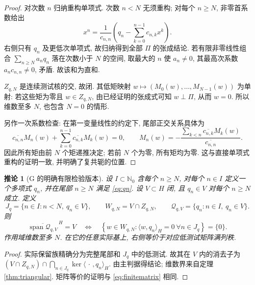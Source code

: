 \documentclass[UTF8,11pt]{ctexart}
\newtheorem{corollary}[theorem]{推论}
\theoremstyle{definition}
\DeclareMathOperator{\Span}{span}
\newcommand{\ip}[2]{\langle #1,#2\rangle_H}
\newcommand{\clspan}[1]{\overline{\Span #1}^{\,H}}
\newcommand{\Q}{\mathcal Q}
\begin{document}
\begin{proof}
对次数 $n$ 归纳重构单项式. 次数 $n<N$ 无须重构;
对每个 $n\geq N$, 非零首系数给出
\begin{equation}\label{eq:qmonomial}
 x^n=\frac{1}{c_{n,n}}\left(q_n-\sum_{k=0}^{n-1}c_{n,k}x^k\right).
\end{equation}
右侧只有 $q_n$ 及更低次单项式, 故归纳得到全部 $\Pi$ 的张成结论.
若有限非零线性组合 $\sum_{n\geq N}a_nq_n$ 落在次数小于 $N$ 的空间,
取最大的 $n$ 使 $a_n\ne0$, 其最高次系数 $a_nc_{n,n}\ne0$, 矛盾.
故该和为直和.

$Z_{q,N}$ 是连续测试核的交, 故闭.
其低矩映射 $w\mapsto(M_0(w),\ldots,M_{N-1}(w))$ 为单射:
若这些矩为零且 $w\in Z_{q,N}$, 由已经证明的张成式可知 $w\perp\Pi$,
从而 $w=0$. 所以维数至多 $N$, 也包含 $N=0$ 的情形.

另作一次系数检查: 在第一变量线性的约定下, 尾部正交关系具体为
\begin{equation}\label{eq:qmoment}
 \overline{c_{n,n}}M_n(w)+\sum_{k=0}^{n-1}\overline{c_{n,k}}M_k(w)=0,
 \qquad
 M_n(w)=-\frac{\sum_{k<n}\overline{c_{n,k}}M_k(w)}{\overline{c_{n,n}}}.
\end{equation}
因此所有矩由前 $N$ 个矩递推决定; 若前 $N$ 个为零, 所有矩均为零.
这与直接单项式重构的证明一致, 并明确了复共轭的位置.
\end{proof}

\begin{corollary}[G 的明确有限检验版本]\label{cor:g}
设 $I\subset\mathbb N_0$ 含每个 $n\geq N$, 对每个 $n\in I$ 定义一个多项式 $q_n$,
并在尾部 $n\geq N$ 满足 \eqref{eq:qn}.
设 $V\subset H$ 闭, 且 $q_n\in V$ 对每个 $n\geq N$ 成立. 定义
\[
 J_q=\{n\in I:n<N,\ q_n\in V\},\qquad W_{q,N}=V\cap Z_{q,N},\qquad
 \Q_{q,V}=\{q_n:n\in I,\ q_n\in V\}.
\]
则
\begin{equation}\label{eq:gcriterion}
 \clspan{\Q_{q,V}}=V\quad\Longleftrightarrow\quad
 \left\{w\in W_{q,N}:\ip{w}{q_n}=0\ \forall n\in J_q\right\}=\{0\}.
\end{equation}
作用域维数至多 $N$. 在它的任意实际基上, 右侧等价于对应低测试矩阵满列秩.
\end{corollary}
\begin{proof}
实际保留族精确分为完整尾部和 $J_q$ 中的低测试.
故其在 $V$ 内的消去子为
$(V\cap Z_{q,N})\cap\bigcap_{n\in J_q}\ker\ip{\,\cdot\,}{q_n}$.
由主判据得结论; 维数界来自定理 \ref{thm:triangular}.
矩阵等价的证明与 \eqref{eq:finitematrix} 相同.
\end{proof}
\end{document}
